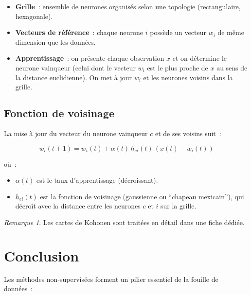 \documentclass[a4paper,11pt]{article}
\theoremstyle{definition}
\theoremstyle{remark}
\newtheorem*{remark}{Remarque}
\begin{document}
\begin{itemize}
  \item \textbf{Grille}~: ensemble de neurones organis\'es selon
    une topologie (rectangulaire, hexagonale).
  \item \textbf{Vecteurs de r\'ef\'erence}~: chaque neurone $i$
    poss\`ede un vecteur $w_i$ de m\^eme dimension que les donn\'ees.
  \item \textbf{Apprentissage}~: on pr\'esente chaque observation
    $x$ et on d\'etermine le neurone vainqueur (celui dont le
    vecteur $w_i$ est le plus proche de $x$ au sens de la distance
    euclidienne). On met \`a jour $w_i$ et les neurones voisins
    dans la grille.
\end{itemize}

\subsection{Fonction de voisinage}

La mise \`a jour du vecteur du neurone vainqueur $c$ et de ses
voisins suit~:

\begin{equation}
w_i(t+1) = w_i(t) + \alpha(t) \, h_{ci}(t) \, (x(t) - w_i(t))
\end{equation}

o\`u~:
\begin{itemize}
  \item $\alpha(t)$ est le taux d'apprentissage (d\'ecroissant).
  \item $h_{ci}(t)$ est la fonction de voisinage (gaussienne
    ou ``chapeau mexicain''), qui d\'ecro\^it avec la distance
    entre les neurones $c$ et $i$ sur la grille.
\end{itemize}

\begin{remark}
  Les cartes de Kohonen sont trait\'ees en d\'etail dans une fiche
  d\'edi\'ee.
\end{remark}

\section{Conclusion}

Les m\'ethodes non-supervis\'ees forment un pilier essentiel de la
fouille de donn\'ees~:
\end{document}
